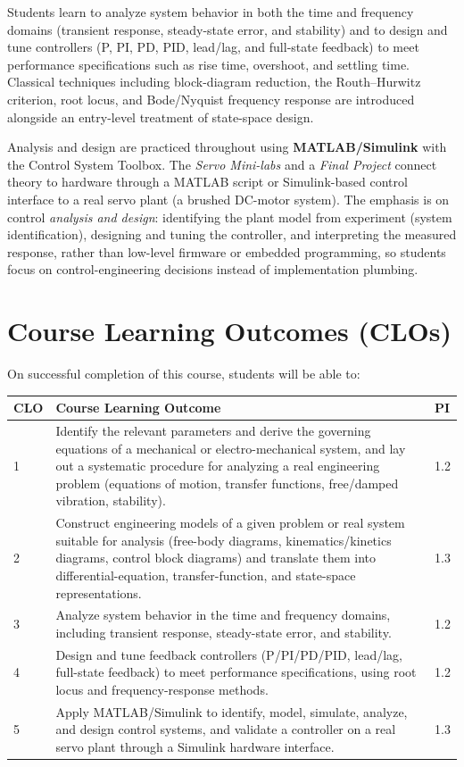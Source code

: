 \documentclass[11pt]{article}
\begin{document}
Students learn to analyze system behavior in both the time and frequency domains
(transient response, steady-state error, and stability) and to design and tune
controllers (P, PI, PD, PID, lead/lag, and full-state feedback) to meet performance
specifications such as rise time, overshoot, and settling time. Classical techniques
including block-diagram reduction, the Routh--Hurwitz criterion, root locus, and
Bode/Nyquist frequency response are introduced alongside an entry-level treatment of
state-space design.

Analysis and design are practiced throughout using \textbf{MATLAB/Simulink} with the
Control System Toolbox. The \emph{Servo Mini-labs} and a \emph{Final Project} connect
theory to hardware through a MATLAB script or Simulink-based control interface to a real servo plant
(a brushed DC-motor system). The emphasis is on control \emph{analysis and design}:
identifying the plant model from experiment (system identification), designing and
tuning the controller, and interpreting the measured response, rather than low-level
firmware or embedded programming, so students focus on control-engineering decisions
instead of implementation plumbing.

\newpage
\section{Course Learning Outcomes (CLOs)}
On successful completion of this course, students will be able to:

\begin{center}
\begin{tabularx}{\textwidth}{@{}C{1cm} X C{1.2cm}@{}}
\toprule
\textbf{CLO} & \textbf{Course Learning Outcome} & \textbf{PI} \\
 & Identify the relevant parameters and derive the governing equations of a mechanical or electro-mechanical system, and lay out a systematic procedure for analyzing a real engineering problem (equations of motion, transfer functions, free/damped vibration, stability). & 1.2 \\
2 & Construct engineering models of a given problem or real system suitable for analysis (free-body diagrams, kinematics/kinetics diagrams, control block diagrams) and translate them into differential-equation, transfer-function, and state-space representations. & 1.3 \\
3 & Analyze system behavior in the time and frequency domains, including transient response, steady-state error, and stability. & 1.2 \\
4 & Design and tune feedback controllers (P/PI/PD/PID, lead/lag, full-state feedback) to meet performance specifications, using root locus and frequency-response methods. & 1.2 \\
5 & Apply MATLAB/Simulink to identify, model, simulate, analyze, and design control systems, and validate a controller on a real servo plant through a Simulink hardware interface. & 1.3 \\
\bottomrule
\end{tabularx}
\end{center}
\end{document}
